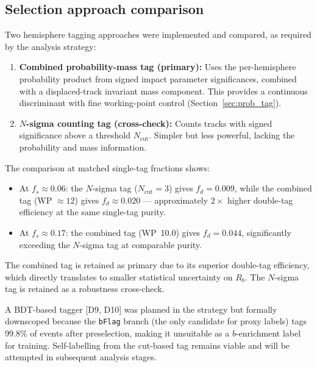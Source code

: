 \documentclass[11pt,a4paper]{article}
\begin{document}
\subsection{Selection approach comparison}
\label{sec:selection_comparison}

Two hemisphere tagging approaches were implemented and compared, as required by the
analysis strategy:

\begin{enumerate}
\item \textbf{Combined probability-mass tag (primary):} Uses the per-hemisphere probability
product from signed impact parameter significances, combined with a displaced-track
invariant mass component. This provides a continuous discriminant with fine working-point
control (Section~\ref{sec:prob_tag}).

\item \textbf{$N$-sigma counting tag (cross-check):} Counts tracks with signed significance
above a threshold $N_\mathrm{cut}$. Simpler but less powerful, lacking the probability
and mass information.
\end{enumerate}

The comparison at matched single-tag fractions shows:
\begin{itemize}
\item At $f_s \approx 0.06$: the $N$-sigma tag ($N_\mathrm{cut} = 3$) gives $f_d = 0.009$,
while the combined tag (WP $\approx 12$) gives $f_d \approx 0.020$ --- approximately
$2\times$ higher double-tag efficiency at the same single-tag purity.
\item At $f_s \approx 0.17$: the combined tag (WP~10.0) gives $f_d = 0.044$, significantly
exceeding the $N$-sigma tag at comparable purity.
\end{itemize}

The combined tag is retained as primary due to its superior double-tag efficiency, which
directly translates to smaller statistical uncertainty on $R_b$. The $N$-sigma tag is
retained as a robustness cross-check.

A BDT-based tagger [D9, D10] was planned in the strategy but formally downscoped
because the \texttt{bFlag} branch (the only candidate for proxy labels) tags 99.8\%
of events after preselection, making it unsuitable as a $b$-enrichment label for training.
Self-labelling from the cut-based tag remains viable and will be attempted in subsequent analysis stages.

\FloatBarrier
{}
\end{document}
